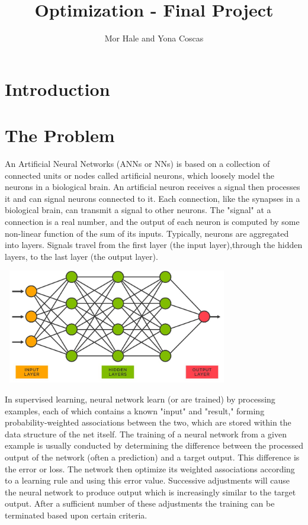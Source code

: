 \documentclass[10pt,a4paper]{article}
\title{\foreignlanguage{english}{Optimization - Final Project}}
\author{Mor Hale and Yona Coscas}
\begin{document}
\maketitle
\section{Introduction}

\section*{The Problem}

An Artificial Neural Networks (ANNs or NNs) is based on a collection of connected units or nodes called artificial neurons, which loosely model the neurons in a biological brain. An artificial neuron receives a signal then processes it and can signal neurons connected to it. Each connection, like the synapses in a biological brain, can transmit a signal to other neurons. The "signal" at a connection is a real number, and the output of each neuron is computed by some non-linear function of the sum of its inputs. Typically, neurons are aggregated into layers. Signals travel from the first layer (the input layer),through the hidden layers, to the last layer (the output layer).\\

\begin{center}
\includegraphics[width=10cm, height=5cm]{neutral-network-diagram.jpg}
\end{center}

In supervised learning, neural network learn (or are trained) by processing examples, each of which contains a known "input" and "result," forming probability-weighted associations between the two, which are stored within the data structure of the net itself. The training of a neural network from a given example is usually conducted by determining the difference between the processed output of the network (often a prediction) and a target output. This difference is the error or loss. The network then optimize its weighted associations according to a learning rule and using this error value. Successive adjustments will cause the neural network to produce output which is increasingly similar to the target output. After a sufficient number of these adjustments the training can be terminated based upon certain criteria.\\
\end{document}
